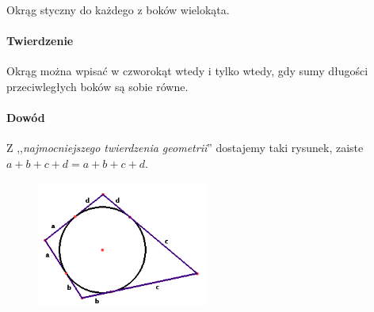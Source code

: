 \documentclass [a4paper, 12pt, oneside]{article}
\begin{document}
Okrąg styczny do każdego z boków wielokąta.

\paragraph{Twierdzenie} Okrąg można wpisać w czworokąt wtedy i tylko wtedy, gdy sumy długości przeciwległych boków są sobie równe.
\paragraph{Dowód} Z ,,\emph{najmocniejszego twierdzenia geometrii}'' dostajemy taki rysunek, zaiste $a+b+c+d = a+b+c+d$.
\begin{figure}[h!]
      \centering\includegraphics[width=0.5\textwidth]{Graphics/geometria2}
	  \end{figure}
\end{document}

